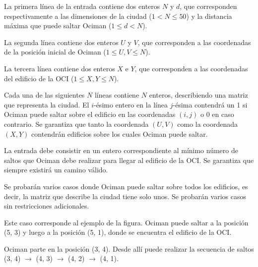 \documentclass{oci}
\begin{document}
\begin{inputDescription}
La primera línea de la entrada contiene dos enteros $N$ y $d$, que corresponden
respectivamente a las dimensiones de la ciudad ($1 < N \leq 50$) y la distancia máxima
que puede saltar Ociman ($1 \le d < N$).

La segunda línea contiene dos enteros $U$ y $V$, que corresponden a las
coordenadas de la posición inicial de Ociman ($1 \le U, V \le N$).

La tercera línea contiene dos enteros $X$ e $Y$, que corresponden a las
coordenadas del edificio de la OCI ($1 \le X, Y \le N$).

Cada una de las siguientes $N$ líneas contiene $N$ enteros, describiendo una
matriz que representa la ciudad.
El $i$-ésimo entero en la línea $j$-ésima contendrá un 1 si Ociman puede saltar
sobre el edificio en las coordenadas $(i, j)$ o 0 en caso contrario.
Se garantiza que tanto la coordenada $(U, V)$ como la coordenada $(X, Y)$
contendrán edificios sobre los cuales Ociman puede saltar.
\end{inputDescription}

\begin{outputDescription}
La entrada debe consistir en un entero correspondiente al mínimo número de saltos
que Ociman debe realizar para llegar al edificio de la OCI.
Se garantiza que siempre existirá un camino válido.
\end{outputDescription}

\begin{scoreDescription}
   Se probarán varios casos donde Ociman puede saltar sobre todos los
  edificios, es decir, la matriz que describe la ciudad tiene solo unos.
   Se probarán varios casos sin restricciones adicionales.
\end{scoreDescription}

\begin{sampleDescription}
Este caso corresponde al ejemplo de la figura.
Ociman puede saltar a la posición (5, 3) y luego a la posición (5, 1), donde se encuentra el edificio de la OCI.

Ociman parte en la posición (3, 4).
Desde allí puede realizar la secuencia de saltos (3, 4) $\rightarrow$ (4, 3) $\rightarrow$ (4, 2) $\rightarrow$ (4, 1).

\end{sampleDescription}
\end{document}
